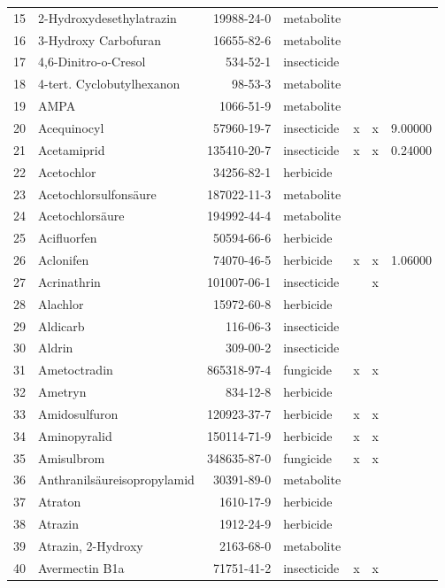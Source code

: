 \begin{longtable}{lp{3cm}rlp{1cm}p{1cm}p{1.5cm}}
  15 & 2-Hydroxydesethylatrazin & 19988-24-0 & metabolite &  &  &  \\ 
  16 & 3-Hydroxy Carbofuran & 16655-82-6 & metabolite &  &  &  \\ 
  17 & 4,6-Dinitro-o-Cresol & 534-52-1 & insecticide &  &  &  \\ 
  18 & 4-tert. Cyclobutylhexanon & 98-53-3 & metabolite &  &  &  \\ 
  19 & AMPA & 1066-51-9 & metabolite &  &  &  \\ 
  20 & Acequinocyl & 57960-19-7 & insecticide & x & x & 9.00000 \\ 
  21 & Acetamiprid & 135410-20-7 & insecticide & x & x & 0.24000 \\ 
  22 & Acetochlor & 34256-82-1 & herbicide &  &  &  \\ 
  23 & Acetochlorsulfonsäure & 187022-11-3 & metabolite &  &  &  \\ 
  24 & Acetochlorsäure & 194992-44-4 & metabolite &  &  &  \\ 
  25 & Acifluorfen & 50594-66-6 & herbicide &  &  &  \\ 
  26 & Aclonifen & 74070-46-5 & herbicide & x & x & 1.06000 \\ 
  27 & Acrinathrin & 101007-06-1 & insecticide &  & x &  \\ 
  28 & Alachlor & 15972-60-8 & herbicide &  &  &  \\ 
  29 & Aldicarb & 116-06-3 & insecticide &  &  &  \\ 
  30 & Aldrin & 309-00-2 & insecticide &  &  &  \\ 
  31 & Ametoctradin & 865318-97-4 & fungicide & x & x &  \\ 
  32 & Ametryn & 834-12-8 & herbicide &  &  &  \\ 
  33 & Amidosulfuron & 120923-37-7 & herbicide & x & x &  \\ 
  34 & Aminopyralid & 150114-71-9 & herbicide & x & x &  \\ 
  35 & Amisulbrom & 348635-87-0 & fungicide & x & x &  \\ 
  36 & Anthranilsäure\-isopropylamid & 30391-89-0 & metabolite &  &  &  \\ 
  37 & Atraton & 1610-17-9 & herbicide &  &  &  \\ 
  38 & Atrazin & 1912-24-9 & herbicide &  &  &  \\ 
  39 & Atrazin, 2-Hydroxy & 2163-68-0 & metabolite &  &  &  \\ 
  40 & Avermectin B1a & 71751-41-2 & insecticide & x & x &  \\ 

\end{longtable}
